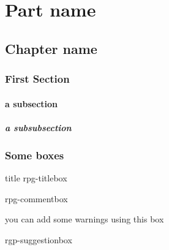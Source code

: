 \documentclass[10pt,a4paper,twocolumn,openany]{book}
\begin{document}
\selectfont %
\frontmatter


\rpgMakeCover[
    image = img/cover,
    logo = img/logo,
    title = Rpg Template,
    subtitle = Created by Krozark the \today\\with XeTeX\\\url{https://github.com/Krozark/RPG-LaTeX-Template},
    color= green!40!black,
    separator=\boolean{separator}
]


\tableofcontents

\mainmatter
\part{Part name}
\chapter{Chapter name}

\section{First Section}
\lipsum[2]

\subsection{a subsection}
\lipsum[1]
\subsubsection{a subsubsection}
\lipsum[1]


\section{Some boxes}
\begin{rpg-titlebox}{title}
	rpg-titlebox
\end{rpg-titlebox}

\begin{rpg-commentbox}
	rpg-commentbox
\end{rpg-commentbox}

\begin{rpg-warnbox}
	you can add some warnings using this box
\end{rpg-warnbox}

\begin{rpg-suggestionbox}
	rgp-suggestionbox
\end{rpg-suggestionbox}
\end{document}
